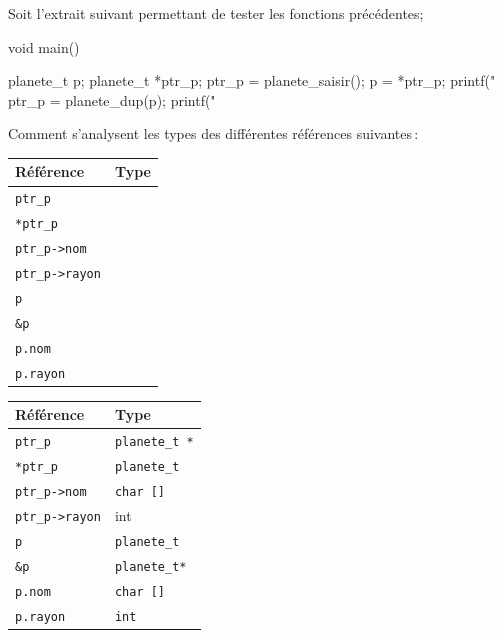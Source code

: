 \documentclass[10pt]{article}\usepackage[nu,correction]{esial}
\begin{document}
\Question  Soit l'extrait suivant permettant de tester les fonctions
précédentes;


\medskip


\begin{boxedverbatim}
void main() {

  planete_t p;
  planete_t *ptr_p;
  ptr_p = planete_saisir();
  p = *ptr_p;
  printf("%
  ptr_p = planete_dup(p);
  printf("%
}
\end{boxedverbatim}


\bigskip Comment s'analysent les types des différentes références
suivantes\,:

\bigskip

\begin{tabular}{|p{.2\linewidth}|p{.3\linewidth}|}
  \hline
  Référence          &   Type  \\\hline
  \verb+ptr_p+       &         \\\hline                  
  \verb+*ptr_p+      &         \\\hline            
  \verb+ptr_p->nom+  &         \\\hline
  \verb+ptr_p->rayon+&         \\\hline
  \verb+p+           &         \\\hline
  \verb+&p+          &         \\\hline
  \verb+p.nom+       &         \\\hline
  \verb+p.rayon+     &         \\\hline
\end{tabular}


\begin{Reponse}

\begin{tabular}{|p{.2\linewidth}|p{.3\linewidth}|}
  \hline
  Référence          &          Type         \\\hline
  \verb+ptr_p+       &  \verb+planete_t *+         \\\hline                  
  \verb+*ptr_p+      &  \verb+planete_t+           \\\hline            
  \verb+ptr_p->nom+  &  \verb+char []+\\\hline
  \verb+ptr_p->rayon+& int\\\hline
  \verb+p+           & \verb+planete_t+\\\hline
  \verb+&p+          & \verb+planete_t*+\\\hline
  \verb+p.nom+       & \verb+char []+\\\hline
  \verb+p.rayon+     & \verb+int+\\\hline
\end{tabular}
~
\end{Reponse}
\end{document}

